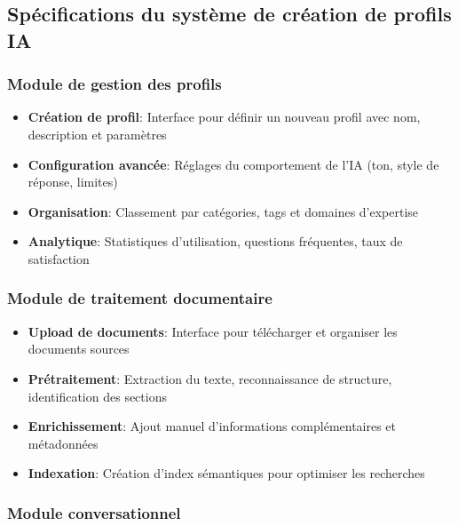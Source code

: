 \subsection{Spécifications du système de création de profils IA}

\subsubsection{Module de gestion des profils}

\begin{itemize}
  \item \textbf{Création de profil}: Interface pour définir un nouveau profil avec nom, description et paramètres
  
  \item \textbf{Configuration avancée}: Réglages du comportement de l'IA (ton, style de réponse, limites)
  
  \item \textbf{Organisation}: Classement par catégories, tags et domaines d'expertise
  
  \item \textbf{Analytique}: Statistiques d'utilisation, questions fréquentes, taux de satisfaction
\end{itemize}

\subsubsection{Module de traitement documentaire}

\begin{itemize}
  \item \textbf{Upload de documents}: Interface pour télécharger et organiser les documents sources
  
  \item \textbf{Prétraitement}: Extraction du texte, reconnaissance de structure, identification des sections
  
  \item \textbf{Enrichissement}: Ajout manuel d'informations complémentaires et métadonnées
  
  \item \textbf{Indexation}: Création d'index sémantiques pour optimiser les recherches
\end{itemize}

\subsubsection{Module conversationnel}

